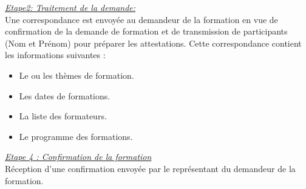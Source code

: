 \underline{\textit{Etape2: Traitement de la demande:}}\\
Une correspondance est envoyée au demandeur de la formation en vue de confirmation de
la demande de formation et de transmission de participants (Nom
et Prénom) pour préparer les attestations. Cette correspondance contient les
informations suivantes :
\begin{itemize}
	\item Le ou les thèmes de formation.
	\item Les dates de formations.
	\item La liste des formateurs.
	\item Le programme des formations.
\end{itemize}
\underline{\textit{Etape 4 : Confirmation de la formation}}\\	
Réception d’une confirmation envoyée par le représentant du
demandeur de la formation.



